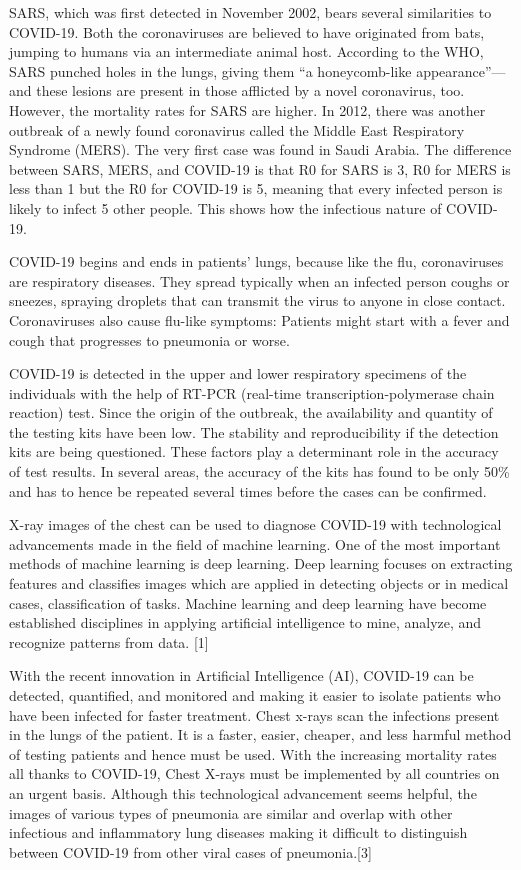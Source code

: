 \documentclass[12pt]{revtex4}
\begin{document}
SARS, which was first detected in November 2002, bears several similarities to COVID-19. Both the coronaviruses are believed to have originated from bats, jumping to humans via an intermediate animal host. According to the WHO, SARS punched holes in the lungs, giving them “a honeycomb-like appearance”—and these lesions are present in those afflicted by a novel coronavirus, too. However, the mortality rates for SARS are higher. In 2012, there was another outbreak of a newly found coronavirus called the Middle East Respiratory Syndrome (MERS). The very first case was found in Saudi Arabia. The difference between SARS, MERS, and COVID-19 is that R0 for SARS is 3, R0 for MERS is less than 1 but the R0 for COVID-19 is 5, meaning that every infected person is likely to infect 5 other people. This shows how the infectious nature of COVID-19.

COVID-19 begins and ends in patients’ lungs, because like the flu, coronaviruses are respiratory diseases. They spread typically when an infected person coughs or sneezes, spraying droplets that can transmit the virus to anyone in close contact. Coronaviruses also cause flu-like symptoms: Patients might start with a fever and cough that progresses to pneumonia or worse.

COVID-19 is detected in the upper and lower respiratory specimens of the individuals with the help of RT-PCR (real-time transcription-polymerase chain reaction) test. Since the origin of the outbreak, the availability and quantity of the testing kits have been low. The stability and reproducibility if the detection kits are being questioned. These factors play a determinant role in the accuracy of test results. In several areas, the accuracy of the kits has found to be only 50\% and has to hence be repeated several times before the cases can be confirmed. 

X-ray images of the chest can be used to diagnose COVID-19 with technological advancements made in the field of machine learning. One of the most important methods of machine learning is deep learning. Deep learning focuses on extracting features and classifies images which are applied in detecting objects or in medical cases, classification of tasks. Machine learning and deep learning have become established disciplines in applying artificial intelligence to mine, analyze, and recognize patterns from data. [1]

With the recent innovation in Artificial Intelligence (AI), COVID-19 can be detected, quantified, and monitored and making it easier to isolate patients who have been infected for faster treatment. Chest x-rays scan the infections present in the lungs of the patient. It is a faster, easier, cheaper, and less harmful method of testing patients and hence must be used. With the increasing mortality rates all thanks to COVID-19, Chest X-rays must be implemented by all countries on an urgent basis. Although this technological advancement seems helpful, the images of various types of pneumonia are similar and overlap with other infectious and inflammatory lung diseases making it difficult to distinguish between COVID-19 from other viral cases of pneumonia.[3] 
\end{document}
